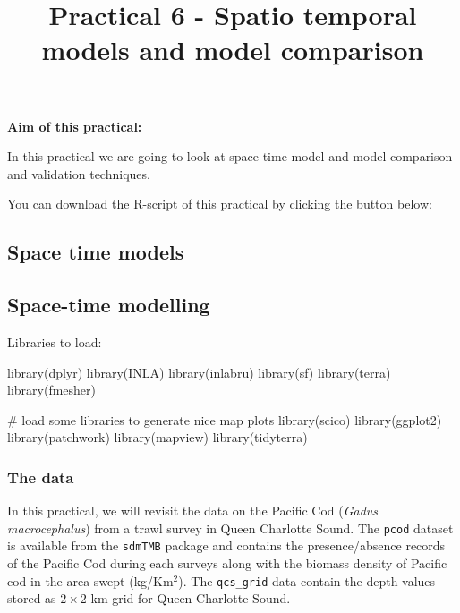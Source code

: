 \documentclass[
  letterpaper,
  DIV=11,
  numbers=noendperiod]{scrartcl}
\title{Practical 6 - Spatio temporal models and model comparison}
\author{}
\date{}
\makeatletter
\newenvironment{Shaded}{\begin{snugshade}}{\end{snugshade}}
\newcommand{\CommentTok}[1]{\textcolor[rgb]{0.37,0.37,0.37}{#1}}
\newcommand{\FunctionTok}[1]{\textcolor[rgb]{0.28,0.35,0.67}{#1}}
\newcommand{\NormalTok}[1]{\textcolor[rgb]{0.00,0.23,0.31}{#1}}
\renewcommand{\maketitle}{\bgroup\setlength{\parindent}{0pt}
\begin{flushleft}
  {\sffamily\huge\textbf{\MakeUppercase{\@title}}} \vspace{0.3cm} \newline
  {\Large {\@subtitle}} \newline
  \@author
\end{flushleft}\egroup
}
\makeatother
\begin{document}
\maketitle

\pagestyle{mystyle}


\textbf{Aim of this practical:}

In this practical we are going to look at space-time model and model
comparison and validation techniques.

You can download the R-script of this practical by clicking the button
below:

\subsection{Space time models}\label{space-time-models}

\subsection{Space-time modelling}\label{space-time-modelling}

Libraries to load:

\begin{Shaded}
\begin{Highlighting}[]
\FunctionTok{library}\NormalTok{(dplyr)}
\FunctionTok{library}\NormalTok{(INLA)}
\FunctionTok{library}\NormalTok{(inlabru) }
\FunctionTok{library}\NormalTok{(sf)}
\FunctionTok{library}\NormalTok{(terra)}
\FunctionTok{library}\NormalTok{(fmesher)}

\CommentTok{\# load some libraries to generate nice map plots}
\FunctionTok{library}\NormalTok{(scico)}
\FunctionTok{library}\NormalTok{(ggplot2)}
\FunctionTok{library}\NormalTok{(patchwork)}
\FunctionTok{library}\NormalTok{(mapview)}
\FunctionTok{library}\NormalTok{(tidyterra)}
\end{Highlighting}
\end{Shaded}

\subsubsection{The data}\label{the-data}

In this practical, we will revisit the data on the Pacific Cod
(\emph{Gadus macrocephalus}) from a trawl survey in Queen Charlotte
Sound. The \texttt{pcod} dataset is available from the \texttt{sdmTMB}
package and contains the presence/absence records of the Pacific Cod
during each surveys along with the biomass density of Pacific cod in the
area swept (kg/Km\(^2\)). The \texttt{qcs\_grid} data contain the depth
values stored as \(2\times 2\) km grid for Queen Charlotte Sound.
\end{document}
